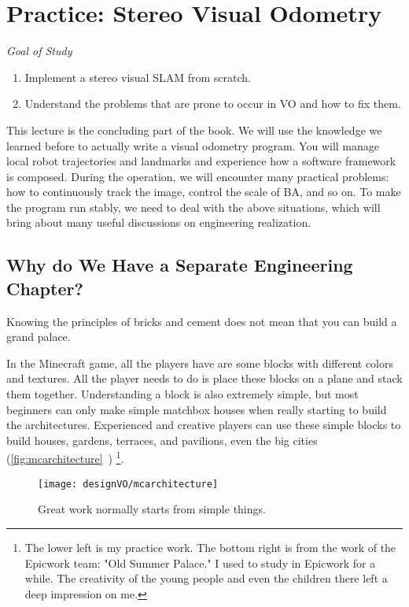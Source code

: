 \chapter{Practice: Stereo Visual Odometry}
\label{cpt:13}
\begin{mdframed}  
	\textit{Goal of Study}
	\begin{enumerate}[labelindent=0em,leftmargin=1.5em]
	\item Implement a stereo visual SLAM from scratch.
	\item Understand the problems that are prone to occur in VO and how to fix them.
	\end{enumerate}
\end{mdframed}

This lecture is the concluding part of the book. We will use the knowledge we learned before to actually write a visual odometry program. You will manage local robot trajectories and landmarks and experience how a software framework is composed. During the operation, we will encounter many practical problems: how to continuously track the image, control the scale of BA, and so on. To make the program run stably, we need to deal with the above situations, which will bring about many useful discussions on engineering realization.

\newpage
\section{Why do We Have a Separate Engineering Chapter?}
Knowing the principles of bricks and cement does not mean that you can build a grand palace.

In the Minecraft game, all the players have are some blocks with different colors and textures. All the player needs to do is place these blocks on a plane and stack them together. Understanding a block is also extremely simple, but most beginners can only make simple matchbox houses when really starting to build the architectures. Experienced and creative players can use these simple blocks to build houses, gardens, terraces, and pavilions, even the big cities (\autoref{fig:mcarchitecture}~) \footnote{The lower left is my practice work. The bottom right is from the work of the Epicwork team: "Old Summer Palace." I used to study in Epicwork for a while. The creativity of the young people and even the children there left a deep impression on me. }.

\begin{figure}[!htp]
	\centering    
	\texttt{[image: designVO/mcarchitecture]}\\
	\caption{Great work normally starts from simple things.}
	\label{fig:mcarchitecture}
\end{figure}

